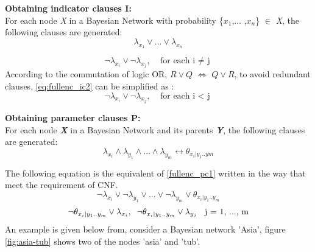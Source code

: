             \textbf{Obtaining indicator clauses \textsc{I}:}\\
            For each node \textit{X} in a Bayesian Network with probability \{$x_{1}$,... ,$x_{n}$\} $\in$ \textit{X}, the following clauses are generated:
            \begin{equation}\label{fullenc_ic1}
                \lambda_{x_{1}} \vee ... \vee \lambda_{x_{n}}
            \end{equation}
            
            \begin{equation}\label{eq:fullenc_ic2}
                \neg\lambda_{x_{i}} \vee \neg\lambda_{x_{j}}, \;\;\; \mbox{for each i $\neq$ j}
            \end{equation}
            According to the commutation of logic OR, $R \vee Q$ $\Longleftrightarrow$ $Q \vee R$, to avoid redundant clauses, \ref{eq:fullenc_ic2} can be simplified as :
            \begin{equation}\label{fullenc_ic3}
                \neg\lambda_{x_{i}} \vee \neg\lambda_{x_{j}}, \;\;\; \mbox{for each i $<$ j}
            \end{equation}
            
            \textbf{Obtaining parameter clauses \textsc{P}:}\\
            For each node \textbf{\textit{X}} in a Bayesian Network and its parents \textbf{\textit{Y}}, the following clauses are generated:
            \begin{equation}\label{fullenc_pc1}
                \lambda_{x_{i}} \wedge \lambda_{y_{1}} \wedge... \wedge \lambda_{y_{m}} \leftrightarrow \theta_{x_{i}|y_{1}..y{m}}
            \end{equation}
            
            The following equation is the equivalent of \ref{fullenc_pc1} written in the way that meet the requirement of CNF.
            \begin{equation}\label{fullenc_IP}
                \neg\lambda_{x_{i}} \vee \neg\lambda_{y_{1}} \vee... \vee \neg\lambda_{y_{m}} \vee \theta_{x_{i}|y_{1}..y_{m}}
            \end{equation}
            \begin{equation}\label{fullenc_PI}
                \neg\theta_{x_{i}|y_{1}..y_{m}} \vee \lambda_{x_{i}},\\ \;\;
                \neg\theta_{x_{i}|y_{1}..y_{m}} \vee \lambda_{y_{j}} \;\; \mbox{ j = 1, ..., m}
            \end{equation}
            An example is given below from, consider a Bayesian network 'Asia', figure \ref{fig:asia-tub} shows two of the nodes 'asia' and 'tub'.
            
